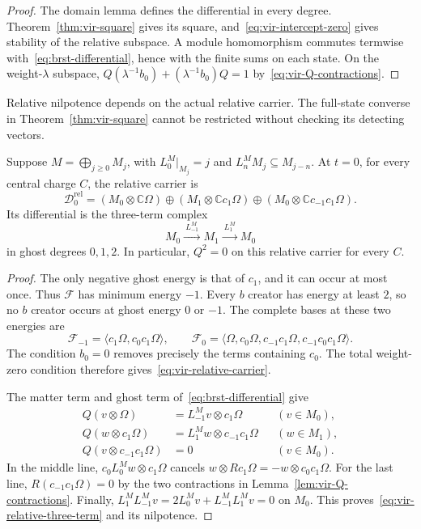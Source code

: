 \begin{proof}
The domain lemma defines the differential in every degree.
Theorem~\ref{thm:vir-square} gives its square, and~\eqref{eq:vir-intercept-zero} gives stability of the relative subspace.
A module homomorphism commutes termwise with~\eqref{eq:brst-differential}, hence with the finite sums on each state.
On the weight-$\lambda$ subspace,
$Q(\lambda^{-1}b_0)+(\lambda^{-1}b_0)Q=1$ by~\eqref{eq:vir-Q-contractions}.
\end{proof}

Relative nilpotence depends on the actual relative carrier.
The full-state converse in Theorem~\ref{thm:vir-square} cannot be restricted without checking its detecting vectors.

\begin{proposition}\label{prop:vir-relative-three-term}
Suppose $M=\bigoplus_{j\geq0}M_j$, with $L_0^M|_{M_j}=j$ and $L_n^MM_j\subseteq M_{j-n}$.
At $t=0$, for every central charge $C$, the relative carrier is
\begin{equation}\label{eq:vir-relative-carrier}
 \mathcal D_0^{\mathrm{rel}}
 =(M_0\otimes\mathbb C\Omega)
 \oplus(M_1\otimes\mathbb Cc_1\Omega)
 \oplus(M_0\otimes\mathbb Cc_{-1}c_1\Omega).
\end{equation}
Its differential is the three-term complex
\begin{equation}\label{eq:vir-relative-three-term}
 M_0\xrightarrow{\ L_{-1}^M\ } M_1
 \xrightarrow{\ L_1^M\ }M_0
\end{equation}
in ghost degrees $0,1,2$.
In particular, $Q^2=0$ on this relative carrier for every $C$.
\end{proposition}

\begin{proof}
The only negative ghost energy is that of $c_1$, and it can occur at most once.
Thus $\mathcal F$ has minimum energy $-1$.
Every $b$ creator has energy at least $2$, so no $b$ creator occurs at ghost energy $0$ or $-1$.
The complete bases at these two energies are
\[
 \mathcal F_{-1}=\langle c_1\Omega,c_0c_1\Omega\rangle,
 \qquad
 \mathcal F_0=\langle\Omega,c_0\Omega,c_{-1}c_1\Omega,c_{-1}c_0c_1\Omega\rangle.
\]
The condition $b_0=0$ removes precisely the terms containing $c_0$.
The total weight-zero condition therefore gives~\eqref{eq:vir-relative-carrier}.

The matter term and ghost term of~\eqref{eq:brst-differential} give
\begin{align*}
 Q(v\otimes\Omega)&=L_{-1}^Mv\otimes c_1\Omega &&(v\in M_0),\\
 Q(w\otimes c_1\Omega)&=L_1^Mw\otimes c_{-1}c_1\Omega &&(w\in M_1),\\
 Q(v\otimes c_{-1}c_1\Omega)&=0 &&(v\in M_0).
\end{align*}
In the middle line, $c_0L_0^Mw\otimes c_1\Omega$ cancels $w\otimes Rc_1\Omega=-w\otimes c_0c_1\Omega$.
For the last line, $R(c_{-1}c_1\Omega)=0$ by the two contractions in Lemma~\ref{lem:vir-Q-contractions}.
Finally,
$L_1^ML_{-1}^Mv=2L_0^Mv+L_{-1}^ML_1^Mv=0$ on $M_0$.
This proves~\eqref{eq:vir-relative-three-term} and its nilpotence.
\end{proof}

